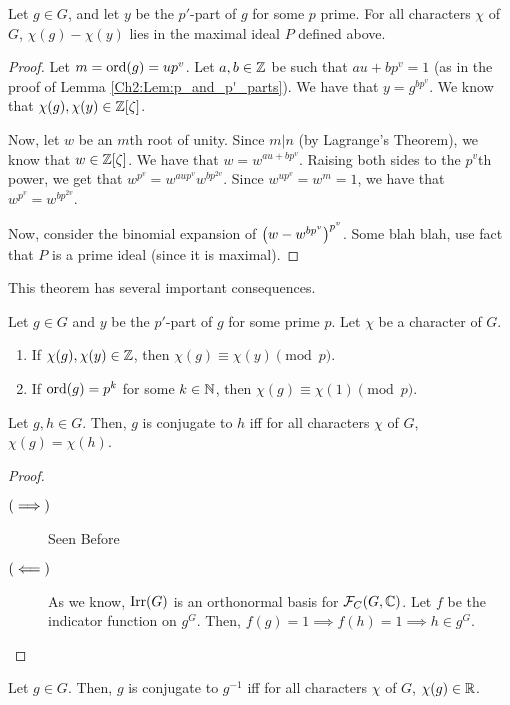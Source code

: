 \begin{theorem}
    Let $g \in G$, and let $y$ be the $p'$-part of $g$ for some $p$ prime. For all characters $\chi$ of $G$, $\chi(g) - \chi(y)$ lies in the maximal ideal $P$ defined above.
\end{theorem}
\begin{proof}
    Let $m = \operatorname{ord}\!\left( g \right) = u p^v$. Let $a,b \in \mathbb{Z}$ be such that $au + b p^v = 1$ (as in the proof of Lemma \ref{Ch2:Lem:p_and_p'_parts}). We have that $y = g^{bp^v}$. We know that $\chi(g), \chi(y) \in \mathbb{Z}[\zeta]$.

    Now, let $w$ be an $m$th root of unity. Since $m \vert n$ (by Lagrange's Theorem), we know that $w \in \mathbb{Z}[\zeta]$. We have that $w = w^{au + bp^v}$. Raising both sides to the $p^v$th power, we get that $w^{p^v} = w^{aup^v} w^{bp^{2v}}$. Since $w^{up^v} = w^m = 1$, we have that $w^{p^v} = w^{bp^{2v}}$.

    Now, consider the binomial expansion of $\left( w - w^{bp^v} \right)^{p^v}$. Some blah blah, use fact that $P$ is a prime ideal (since it is maximal). %
\end{proof}

This theorem has several important consequences.

\begin{corollary}
    Let $g \in G$ and $y$ be the $p'$-part of $g$ for some prime $p$. Let $\chi$ be a character of $G$.
    \begin{enumerate}[label = \normalfont \arabic*., noitemsep]
        \item If $\chi(g), \chi(y) \in \mathbb{Z}$, then $\chi(g) \equiv \chi(y) \pmod{p}$.
        \item If $\operatorname{ord}\!\left( g \right) = p^k$ for some $k \in \mathbb{N}$, then $\chi(g) \equiv \chi(1) \pmod{p}$.
    \end{enumerate}
\end{corollary}

\begin{lemma}
    Let $g, h \in G$. Then, $g$ is conjugate to $h$ iff for all characters $\chi$ of $G$, $\chi(g) = \chi(h)$.
\end{lemma}
\begin{proof}
    \hfill
    \begin{description}
        \item[$\left( \implies \right)$] Seen Before
        \item[$\left( \impliedby \right)$] As we know, $\operatorname{Irr}\!\left( G \right)$ is an orthonormal basis for $\mathcal{F}_C\!\left( G, \mathbb{C} \right)$. Let $f$ be the indicator function on $g^G$. Then, $f(g) = 1 \implies f(h) = 1 \implies h \in g^G$.
    \end{description}
\end{proof}
\begin{corollary}
    Let $g \in G$. Then, $g$ is conjugate to $g^{-1}$ iff for all characters $\chi$ of $G$, $\chi(g) \in \mathbb{R}$.
\end{corollary}

